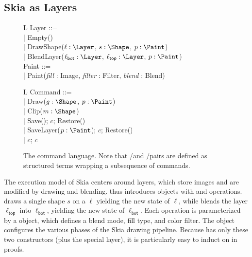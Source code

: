 \subsection{Skia as Layers}
\label{subsec:sem-layers}

\begin{figure}
  \begin{minipage}{0.51\linewidth}
    \centering
    \begin{tabular}{L}
      Layer ::= \\
      | Empty() \\
      | DrawShape($\ell: \Layer$, $s: \Shape$, $p: \Paint$) \\
      | BlendLayer($\ell_{\textsf{bot}}: \Layer$, $\ell_{\textsf{top}}: \Layer$, $p: \Paint$) \\[4pt]

      Paint ::= \\
      | Paint(\textit{fill} : Image, \textit{filter} : Filter, \textit{blend} : Blend)
    \end{tabular}
    \caption{
      \Layer objects store images and are modified
        by drawing and blending operations.
      Each drawing or blending operation
        is parameterized by a \Paint object.
      \Layer terms denote to the abstract model
        of .
      }
    \label{fig:layerlang}
  \end{minipage}%
  \hfill%
  \begin{minipage}[T]{0.45\linewidth}
    \centering
    \begin{tabular}{L}
      Command ::= \\
      | Draw($g: \Shape$, $p : \Paint$) \\
      | Clip($m : \Shape$) \\
      | Save(); $c$; Restore() \\
      | SaveLayer($p: \Paint$); $c$; Restore() \\
      | $c$; $c$
    \end{tabular}
    \caption{The \muskia command language.
      Note that \Save/\Restore and \SaveLayer/\Restore pairs
        are defined as structured terms
        wrapping a subsequence of commands.
      }
    \label{fig:muskia}
  \end{minipage}
\end{figure}

The execution model of Skia centers around layers,
  which store images
  and are modified by drawing and blending.
 thus introduces \Layer objects
  with \DrawShape and \BlendLayer operations.
\DrawShape draws a single shape $s$ on a \Layer $\ell$
  yielding the new state of $\ell$,
  while \BlendLayer blends the layer $\ell_\textsf{top}$
  into $\ell_\textsf{bot}$, yielding the new state of $\ell_\textsf{bot}$.
Each operation is parameterized by a \Paint object,
  which defines a blend mode, fill type, and color filter.
The \Paint object configures the various phases
  of the Skia drawing pipeline.
Because \Layer has only these two constructors
  (plus the special \Empty layer),
  it is particularly easy to induct on in proofs.


